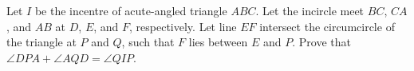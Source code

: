 Let $I$ be the incentre of acute-angled triangle $ABC$. Let the incircle meet $BC$, $CA$, and $AB$ at $D$, $E$, and $F$, respectively. Let line $EF$ intersect the circumcircle of the triangle at $P$ and $Q$, such that $F$ lies between $E$ and $P$. Prove that $\angle DPA + \angle AQD = \angle QIP$.
